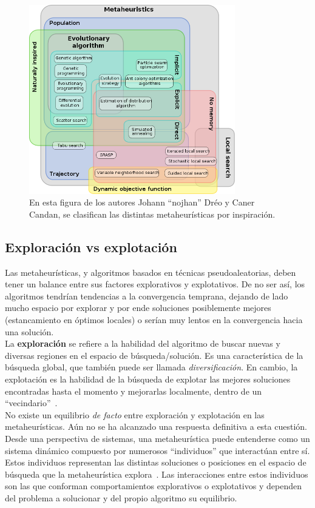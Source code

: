 \begin{figure}[H]
    \begin{center}
        \includegraphics[width=0.8\textwidth]{imagenes/mh_euler_graph.png}
    \end{center}
    \caption[Clasificación metaheurísticas]{En esta figura de los autores Johann ``nojhan'' Dréo y Caner Candan, se clasifican las distintas metaheurísticas por inspiración.}
\end{figure}

\subsection{Exploración vs explotación}
Las metaheurísticas, y algoritmos basados en técnicas pseudoaleatorias, deben tener un balance entre sus factores explorativos y explotativos. De no ser así, los algoritmos tendrían tendencias a la convergencia temprana, dejando de lado mucho espacio por explorar y por ende soluciones posiblemente mejores (estancamiento en óptimos locales) o serían muy lentos en la convergencia hacia una solución.\\[6pt]
La \textbf{exploración} se refiere a la habilidad del algoritmo de buscar nuevas y diversas regiones en el espacio de búsqueda/solución. Es una característica de la búsqueda global, que también puede ser llamada \textit{diversificación}. En cambio, la explotación es la habilidad de la búsqueda de explotar las mejores soluciones encontradas hasta el momento y mejorarlas localmente, dentro de un ``vecindario''~\cite{xu2014exploration}.\\[6pt]
No existe un equilibrio \textit{de facto} entre exploración y explotación en las metaheurísticas. Aún no se ha alcanzado una respuesta definitiva a esta cuestión. Desde una perspectiva de sistemas, una metaheurística puede entenderse como un sistema dinámico compuesto por numerosos ``individuos'' que interactúan entre sí. Estos individuos representan las distintas soluciones o posiciones en el espacio de búsqueda que la metaheurística explora~\cite{6896450}. Las interacciones entre estos individuos son las que conforman comportamientos explorativos o explotativos y dependen del problema a solucionar y del propio algoritmo su equilibrio.

